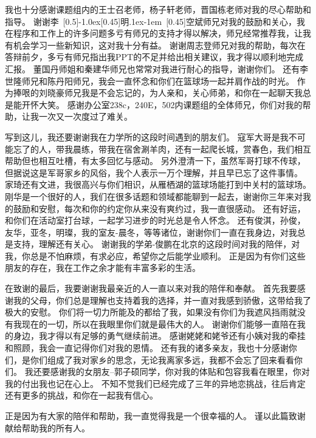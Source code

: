 我也十分感谢课题组内的王士召老师，杨子轩老师，晋国栋老师对我的尽心帮助和指导。
谢谢李\hbox{\scalebox{0.5} [0.5]{}\lower-1.0ex\hbox{\scalebox{1}[0.45]{明}}\lower.1ex\hbox{\kern-1em \scalebox{1}[0.45]{空}}}斌师兄对我的鼓励和关心，我在程序和工作上的许多问题多亏有师兄的支持才得以解决，师兄经常推荐我，让我有机会学习一些新知识，这对我十分有益。
谢谢周志登师兄对我的帮助，每次在答辩前夕，多亏有师兄指出我PPT的不足并给出相关建议，我才得以顺利地完成汇报。
董国丹师姐和秦建华师兄也常常对我进行耐心的指导，谢谢你们。
还有李世隆师兄和陈丹阳师兄，我会一直怀念和你们在篮球场一起并肩作战的时光。
作为捧哏的刘晓豪师兄我是不会忘记的，为人亲和，关心师弟，和你在一起聊天我总是能开怀大笑。
感谢办公室238c，240E，502内课题组的全体师兄，你们对我的帮助，让我一次又一次度过了难关。

写到这儿，我还要谢谢我在力学所的这段时间遇到的朋友们。
寇军大哥是我不可能忘了的人，带我晨练，带我在宿舍涮羊肉，还有一起爬长城，赏春色，我们相互帮助但也相互吐槽，有太多回忆与感动。
另外澄清一下，虽然军哥打球不传球，但据说这是军哥家乡的风俗，我个人表示一万个理解，并且早已忘了这件事情。
家琦还有文进，我很高兴与你们相识，从雁栖湖的篮球场能打到中关村的篮球场。
刚华是一个很好的人，我们在很多话题和领域都能聊到一起去，谢谢你三年来对我的鼓励和安慰，每次和你的约定你从来没有爽约过，我一直很感动。 
还有好运，和你们在活动室打台球，一起学习进步的时光总是令人怀念。
还有俊淇，孙俊，友华，亚冬，明璨，我的室友-晨冬，等等诸位，谢谢你们一直在我身边，对我总是支持，理解还有关心。
谢谢我的学弟-俊鹏在北京的这段时间对我的陪伴，对我，你总是不怕麻烦，有求必应，希望你之后能学业顺利。
正是因为有你们这些朋友的存在，我在工作之余才能有丰富多彩的生活。

在致谢的最后，我要谢谢我最亲近的人一直以来对我的陪伴和奉献。
首先我要感谢我的父母，你们总是理解也支持着我的选择，并一直对我感到骄傲，这带给我了极大的安慰。
你们将一切力所能及的都给了我，如果没有你们为我遮风挡雨就没有我现在的一切，所以在我眼里你们就是最伟大的人。
谢谢你们能够一直陪在我的身边，我才得以有足够的勇气继续前进。
感谢姥姥和姥爷还有小姨对我的牵挂和照顾，我会一直记得你们对我的恩情。
还有我的诸多亲友，我也十分感谢你们，是你们组成了我对家乡的思念，无论我离家多远，我都不会忘了回来看看你们。
我还要感谢我的女朋友--郭子硕同学，你对我的体贴和包容我看在眼里，你对我的付出我也记在心上。
不知不觉我们已经完成了三年的异地恋挑战，往后肯定还有更多的挑战，和你在一起我有信心。


正是因为有大家的陪伴和帮助，我一直觉得我是一个很幸福的人。
谨以此篇致谢献给帮助我的所有人。
